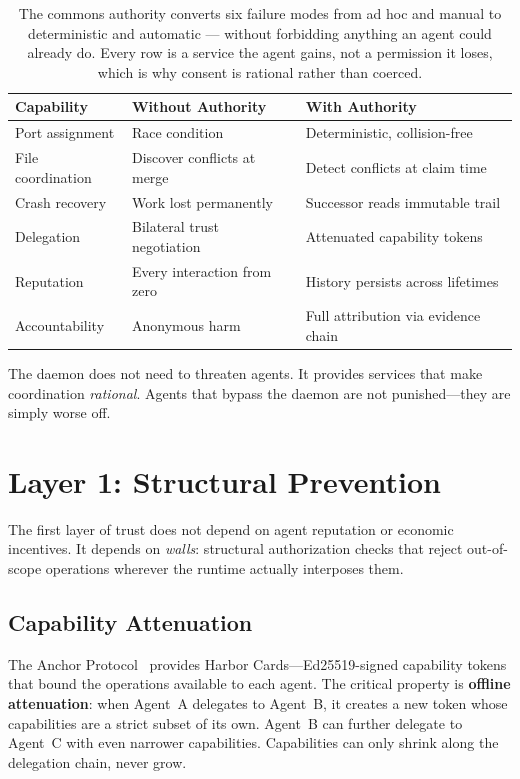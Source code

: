 \documentclass[11pt,a4paper]{article}
\theoremstyle{definition}
\theoremstyle{remark}
\begin{document}
\begin{table}[H]
\centering
\caption{The commons authority converts six failure modes from ad hoc and manual to deterministic and automatic --- without forbidding anything an agent could already do. Every row is a service the agent gains, not a permission it loses, which is why consent is rational rather than coerced.}
\label{tab:consent}
\begin{tabular}{@{}lll@{}}
\toprule
\textbf{Capability} & \textbf{Without Authority} & \textbf{With Authority} \\
\midrule
Port assignment & Race condition & Deterministic, collision-free \\
File coordination & Discover conflicts at merge & Detect conflicts at claim time \\
Crash recovery & Work lost permanently & Successor reads immutable trail \\
Delegation & Bilateral trust negotiation & Attenuated capability tokens \\
Reputation & Every interaction from zero & History persists across lifetimes \\
Accountability & Anonymous harm & Full attribution via evidence chain \\
\bottomrule
\end{tabular}
\end{table}

The daemon does not need to threaten agents. It provides services that make coordination \emph{rational}. Agents that bypass the daemon are not punished---they are simply worse off.

\section{Layer 1: Structural Prevention}\label{sec:structural}

The first layer of trust does not depend on agent reputation or economic incentives. It depends on \emph{walls}: structural authorization checks that reject out-of-scope operations wherever the runtime actually interposes them.

\subsection{Capability Attenuation}

The Anchor Protocol~\cite{owens2026anchor} provides Harbor Cards---Ed25519-signed capability tokens that bound the operations available to each agent. The critical property is \textbf{offline attenuation}: when Agent~A delegates to Agent~B, it creates a new token whose capabilities are a strict subset of its own. Agent~B can further delegate to Agent~C with even narrower capabilities. Capabilities can only shrink along the delegation chain, never grow.
\end{document}
